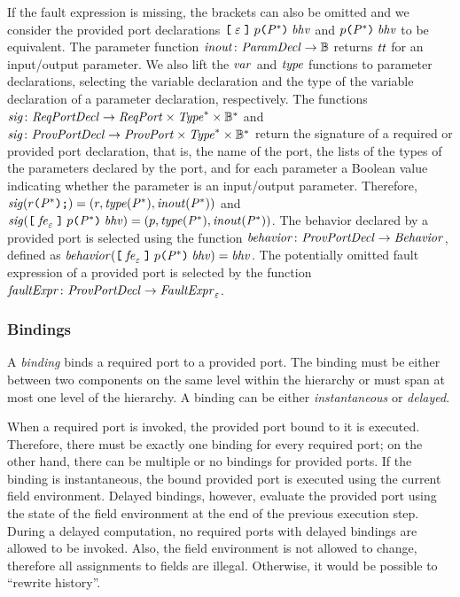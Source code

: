 \documentclass[a4paper,10pt,english]{article}
\begin{document}
If the fault expression is missing, the brackets can also be omitted and we consider the provided port declarations
$\texttt{[} \; \varepsilon \; \texttt{]} \; p \texttt{(} \mathit{P}^* \texttt{)} \; \mathit{bhv}$ and $p \texttt{(} \mathit{P}^* \texttt{)} \; \mathit{bhv}$ to be
equivalent.
The parameter function $\mathit{inout} \colon \mathit{ParamDecl} \rightarrow \mathbb{B}$ returns $\mathit{tt}$ for an input/output parameter. We also
lift the $\mathit{var}$ and $\mathit{type}$ functions to parameter declarations, selecting the variable declaration and the type of the
variable declaration of a parameter declaration, respectively.
The functions $\mathit{sig} \colon \mathit{ReqPortDecl} \rightarrow \mathit{ReqPort} \times \mathit{Type}^* \times \mathbb{B}^*$ and $\mathit{sig}
\colon \mathit{ProvPortDecl} \rightarrow \mathit{ProvPort} \times \mathit{Type}^* \times \mathbb{B}^*$ return the signature of a required or
provided port declaration, that is, the name of the port, the lists of the types of the parameters declared by the port, and for
each parameter a Boolean value indicating whether the parameter is an input/output parameter.
Therefore, $\mathit{sig}(r \texttt{(} \mathit{P}^*\texttt{)} \texttt{;}) = (r, \mathit{type}(\mathit{P}^*),
\mathit{inout}(\mathit{P}^*))$ and
$\mathit{sig}(\texttt{[} \; \mathit{fe}_\varepsilon \; \texttt{]} \; p \texttt{(} \mathit{P}^* \texttt{)} \; \mathit{bhv}) =
(p, \mathit{type}(\mathit{P}^*),
\mathit{inout}(\mathit{P}^*))$. The behavior declared by a provided port is
selected using the function $\mathit{behavior} \colon \mathit{ProvPortDecl} \rightarrow \mathit{Behavior}$, defined as
$\mathit{behavior}(\texttt{[} \; \mathit{fe}_\varepsilon \; \texttt{]} \; p \texttt{(} \mathit{P}^* \texttt{)} \; \mathit{bhv}) =
\mathit{bhv}$. The potentially omitted fault expression of a provided port is selected by the function $\mathit{faultExpr} \colon
\mathit{ProvPortDecl} \rightarrow \mathit{FaultExpr}_\varepsilon$.

\subsubsection{Bindings}
A \textit{binding} binds a required port to a provided port. The binding must be either between two components on the
same level within the hierarchy or must span at most one level of the hierarchy. A binding can be either
\textit{instantaneous} or \textit{delayed}.

When a required port is invoked, the provided port bound to it is executed. Therefore, there must be exactly one binding for every
required port; on the other hand, there can be multiple or no bindings for provided ports. If the binding is instantaneous, the
bound provided port is executed using the current field environment. Delayed bindings, however, evaluate the provided port using
the state of the field environment at the end of the previous execution step. During a delayed computation, no required ports with
delayed bindings are allowed to be invoked. Also, the field environment is not allowed to change, therefore all assignments to
fields are illegal. Otherwise, it would be possible to ``rewrite history''.
\end{document}
